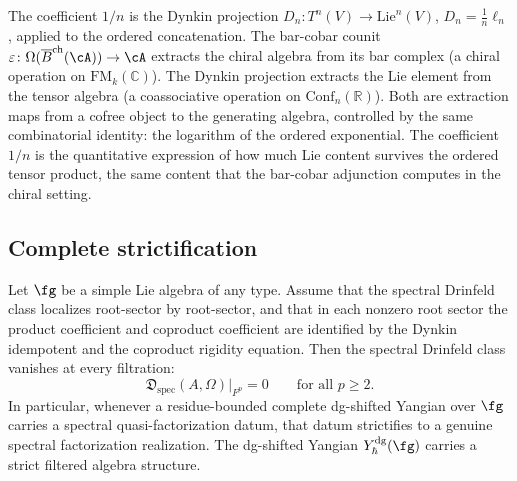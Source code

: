 \begin{remark}
The coefficient $1/n$ is the Dynkin projection
$D_n\colon T^n(V)\to\mathrm{Lie}^n(V)$,
$D_n=\frac{1}{n}\ell_n$, applied to the ordered concatenation.
The bar-cobar counit $\varepsilon\colon\Omega(\Barch(\cA))\to\cA$
extracts the chiral algebra from its bar complex (a chiral
operation on $\mathrm{FM}_k(\mathbb{C})$). The Dynkin projection
extracts the Lie element from the tensor algebra (a coassociative
operation on $\mathrm{Conf}_n(\mathbb{R})$). Both are extraction
maps from a cofree object to the generating algebra, controlled
by the same combinatorial identity: the logarithm of the ordered
exponential. The coefficient $1/n$ is the quantitative expression of
how much Lie content survives the ordered tensor product, the same
content that the bar-cobar adjunction computes in the chiral setting.
\end{remark}

\subsection{Complete strictification}

\begin{theorem}
\label{thm:complete-strictification-v1}
Let $\fg$ be a simple Lie algebra of any type. Assume that the
spectral Drinfeld class localizes root-sector by root-sector, and
that in each nonzero root sector the product coefficient and coproduct
coefficient are identified by the Dynkin idempotent and the coproduct
rigidity equation. Then the spectral Drinfeld class vanishes at every
filtration:
\[
\mathfrak{D}_{\mathrm{spec}}(A,\Omega)\big|_{F^p}=0
\qquad\text{for all }p\ge 2.
\]
In particular, whenever a residue-bounded complete dg-shifted Yangian
over $\fg$ carries a spectral quasi-factorization datum, that datum
strictifies to a genuine spectral factorization realization.
The dg-shifted Yangian $Y^{\mathrm{dg}}_\hbar(\fg)$ carries a strict filtered
algebra structure.
\end{theorem}

